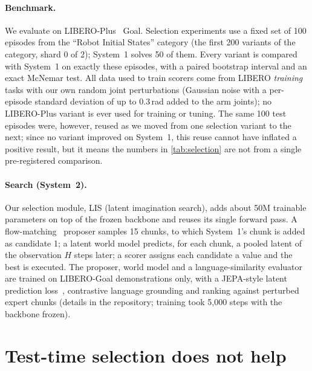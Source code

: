 \documentclass{article}
\begin{document}
\paragraph{Benchmark.} We evaluate on LIBERO-Plus~\citep{fei2025liberoplus} Goal. Selection experiments use a fixed set of 100 episodes from the ``Robot Initial States'' category (the first 200 variants of the category, shard 0 of 2); System~1 solves 50 of them. Every variant is compared with System~1 on exactly these episodes, with a paired bootstrap interval and an exact McNemar test. All data used to train scorers come from LIBERO \emph{training} tasks with our own random joint perturbations (Gaussian noise with a per-episode standard deviation of up to 0.3\,rad added to the arm joints); no LIBERO-Plus variant is ever used for training or tuning. The same 100 test episodes were, however, reused as we moved from one selection variant to the next; since no variant improved on System~1, this reuse cannot have inflated a positive result, but it means the numbers in \cref{tab:selection} are not from a single pre-registered comparison.



\paragraph{Search (System~2).} Our selection module, LIS (latent imagination search), adds about 50M trainable parameters on top of the frozen backbone and reuses its single forward pass. A flow-matching~\citep{lipman2022flow,liu2022rectified} proposer samples 15 chunks, to which System~1's chunk is added as candidate 1; a latent world model predicts, for each chunk, a pooled latent of the observation $H$ steps later; a scorer assigns each candidate a value and the best is executed. The proposer, world model and a language-similarity evaluator are trained on LIBERO-Goal demonstrations only, with a JEPA-style latent prediction loss~\citep{assran2023ijepa}, contrastive language grounding and ranking against perturbed expert chunks (details in the repository; training took 5{,}000 steps with the backbone frozen).

\section{Test-time selection does not help}
\label{sec:selection}
\end{document}
